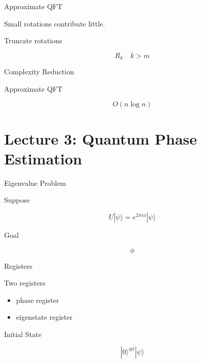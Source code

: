 \documentclass{beamer}
\begin{document}

\begin{frame}{Approximate QFT}

Small rotations contribute little.

Truncate rotations

\[
R_k \quad k>m
\]

\end{frame}


\begin{frame}{Complexity Reduction}

Approximate QFT

\[
O(n\log n)
\]

\end{frame}

\section{Lecture 3: Quantum Phase Estimation}

\begin{frame}{Eigenvalue Problem}

Suppose

\[
U|\psi\rangle=e^{2\pi i\phi}|\psi\rangle
\]

Goal

\[
\phi
\]

\end{frame}


\begin{frame}{Registers}

Two registers

\begin{itemize}
\item phase register
\item eigenstate register
\end{itemize}

\end{frame}


\begin{frame}{Initial State}

\[
|0\rangle^{\otimes t}|\psi\rangle
\]

\end{frame}
\end{document}

